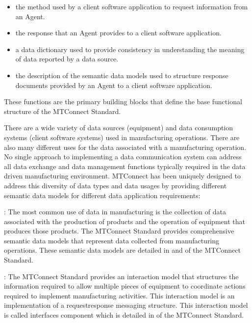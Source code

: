 \begin{itemize}

\item the method used by a client software application to request information from an \gls{Agent}.

\item the response that an \gls{Agent} provides to a client software application.

\item a \gls{data dictionary} used to provide consistency in understanding the meaning of data reported by a data source.

\item the description of the \glspl{semantic data model} used to structure \glspl{response document} provided by an \gls{Agent} to a client software application.

\end{itemize}

These functions are the primary building blocks that define the \gls{base functional structure} of the MTConnect Standard.

There are a wide variety of data sources (equipment) and data consumption systems (client software systems) used in manufacturing operations.  There are also many different uses for the data associated with a manufacturing operation.  No single approach to implementing a data communication system can address all data exchange and data management functions typically required in the data driven manufacturing environment.  MTConnect has been uniquely designed to address this diversity of data types and data usages by providing different \glspl{semantic data model} for different data application requirements:

: The most common use of data in manufacturing is the collection of data associated with the production of products and the operation of equipment that produces those products.  The MTConnect Standard provides comprehensive \glspl{semantic data model} that represent data collected from manufacturing operations.  These \glspl{semantic data model} are detailed in  and  of the MTConnect Standard.

:  The MTConnect Standard provides an \gls{interaction model} that structures the information required to allow multiple pieces of equipment to coordinate actions required to implement manufacturing activities.  This \gls{interaction model} is an implementation of a \gls{requestresponse}  messaging structure.  This \gls{interaction model} is called \gls{interfaces component} which is detailed in  of the MTConnect Standard.

